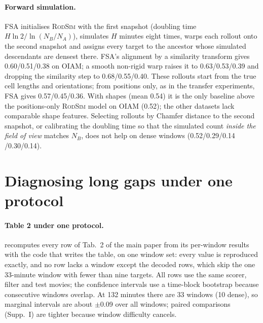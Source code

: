 \documentclass[10pt,twocolumn,letterpaper]{article}
\newcommand{\rodsim}{\textsc{RodSim}\xspace}
\begin{document}
\paragraph{Forward simulation.}
FSA initialises \rodsim with the first snapshot (doubling time $H\ln 2/\ln(N_B/N_A)$), simulates $H$ minutes eight times, warps each rollout onto the second snapshot and assigns every target to the ancestor whose simulated descendants are densest there.
FSA's alignment by a similarity transform gives 0.60/0.51/0.38 on OIAM; a smooth non-rigid warp raises it to 0.63/0.53/0.39 and dropping the similarity step to 0.68/0.55/0.40.
These rollouts start from the true cell lengths and orientations; from positions only, as in the transfer experiments, FSA gives 0.57/0.45/0.36. With shapes (mean 0.54) it is the only baseline above the positions-only \rodsim model on OIAM (0.52); the other datasets lack comparable shape features.
Selecting rollouts by Chamfer distance to the second snapshot, or calibrating the doubling time so that the simulated count \emph{inside the field of view} matches $N_B$, does not help on dense windows (0.52/0.29/0.14 /0.30/0.14).

\section{Diagnosing long gaps under one protocol}
\label{sec:diagnosis}
\paragraph{Table 2 under one protocol.}
 recomputes every row of Tab.~2 of the main paper from its per-window results with the code that writes the table, on one window set: every value is reproduced exactly, and no row lacks a window except the decoded rows, which skip the one 33-minute window with fewer than nine targets. All rows use the same scorer, filter and test movies; the confidence intervals use a time-block bootstrap because consecutive windows overlap. At 132 minutes there are 33 windows (10 dense), so marginal intervals are about $\pm$0.09 over all windows; paired comparisons (Supp.~I) are tighter because window difficulty cancels.

\end{document}
